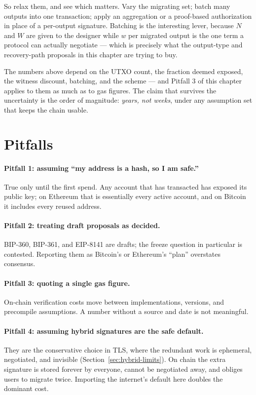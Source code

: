 So relax them, and see which matters. Vary the migrating set; batch many outputs
into one transaction; apply an aggregation or a proof-based authorization in
place of a per-output signature. Batching is the interesting lever, because $N$
and $W$ are given to the designer while $w$ per migrated output is the one term a
protocol can actually negotiate --- which is precisely what the output-type and
recovery-path proposals in this chapter are trying to buy.

\begin{remark}
The numbers above depend on the UTXO count, the fraction deemed exposed, the
witness discount, batching, and the scheme --- and Pitfall 3 of this chapter
applies to them as much as to gas figures. The claim that survives the
uncertainty is the order of magnitude: \emph{years, not weeks}, under any
assumption set that keeps the chain usable.
\end{remark}

\section{Pitfalls}

\paragraph{Pitfall 1: assuming ``my address is a hash, so I am safe.''}
True only until the first spend. Any account that has transacted has exposed its public key; on Ethereum that is essentially every active account, and on Bitcoin it includes every reused address.

\paragraph{Pitfall 2: treating draft proposals as decided.}
BIP-360, BIP-361, and EIP-8141 are drafts; the freeze question in particular is contested. Reporting them as Bitcoin's or Ethereum's ``plan'' overstates consensus.

\paragraph{Pitfall 3: quoting a single gas figure.}
On-chain verification costs move between implementations, versions, and precompile assumptions. A number without a source and date is not meaningful.

\paragraph{Pitfall 4: assuming hybrid signatures are the safe default.}
They are the conservative choice in TLS, where the redundant work is ephemeral,
negotiated, and invisible (Section~\ref{sec:hybrid-limits}). On chain the extra
signature is stored forever by everyone, cannot be negotiated away, and obliges
users to migrate twice. Importing the internet's default here doubles the
dominant cost.

